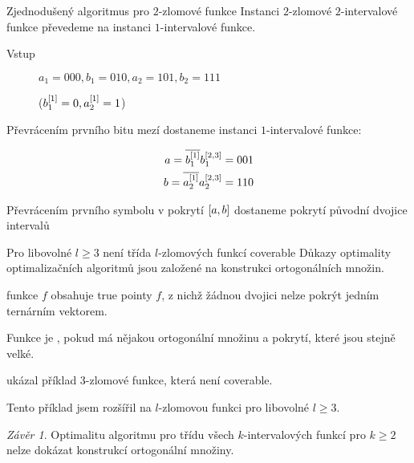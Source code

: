 \documentclass{beamer}
\theoremstyle{remark}
\newtheorem{conclusion}{Závěr}
\begin{document}
\begin{frame}{Zjednodušený algoritmus pro $2$-zlomové funkce}
Instanci $2$-zlomové $2$-intervalové funkce převedeme na instanci $1$-intervalové funkce.


\begin{example}
\begin{description}
\item[Vstup]
$a_1 = 000, b_1 = 010, a_2 = 101, b_2 = 111$

($b_1^{[1]} = 0, a_2^{[1]} = 1$)
\end{description}

Převrácením prvního bitu mezí dostaneme instanci $1$-intervalové funkce:

\begin{align*}
a = \overline{b_1^{[1]}} b_1^{[2, 3]} = 001 \\
b = \overline{a_2^{[1]}} a_2^{[2, 3]} = 110
\end{align*}

Převrácením prvního symbolu v pokrytí $[a, b]$ dostaneme pokrytí původní dvojice intervalů
\end{example}

\end{frame}

\begin{frame}{Pro libovolné $l \geq 3$ není třída $l$-zlomových funkcí coverable}
Důkazy optimality optimalizačních algoritmů jsou založené na konstrukci ortogonálních množin.

\begin{definition}
 funkce $f$ obsahuje true pointy $f$,
z nichž žádnou dvojici nelze pokrýt jedním ternárním vektorem.

Funkce je ,
pokud má nějakou ortogonální množinu a pokrytí, které jsou stejně velké.
\end{definition}

\citet{Dubovsky2012} ukázal příklad $3$-zlomové funkce,
která není coverable.

Tento příklad jsem rozšířil na $l$-zlomovou funkci pro libovolné $l \geq 3$.

\begin{conclusion}
Optimalitu algoritmu pro třídu všech $k$-intervalových funkcí pro $k \geq 2$ nelze dokázat konstrukcí ortogonální množiny.
\end{conclusion}
\end{frame}
\end{document}
